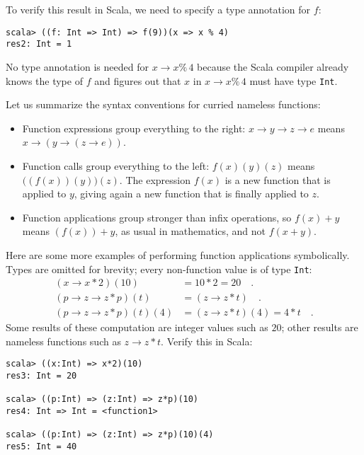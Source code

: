 To verify this result in Scala, we need to specify a type annotation
for $f$:
\begin{lstlisting}
scala> ((f: Int => Int) => f(9))(x => x % 4)
res2: Int = 1
\end{lstlisting}
No type annotation is needed for $x\rightarrow x\%\,4$ because the
Scala compiler already knows the type of $f$ and figures out that
$x$ in $x\rightarrow x\%\,4$ must have type \lstinline!Int!.

Let us summarize the syntax conventions for curried nameless functions:
\begin{itemize}
\item Function expressions group everything to the right: $x\rightarrow y\rightarrow z\rightarrow e$
means $x\rightarrow\left(y\rightarrow\left(z\rightarrow e\right)\right)$.
\item Function calls group everything to the left: $f(x)(y)(z)$ means $\big((f(x))(y)\big)(z)$.
The expression $f(x)$ is a new function that is applied to $y$,
giving again a new function that is finally applied to $z$.
\item Function applications group stronger than infix operations, so $f(x)+y$
means $(f(x))+y$, as usual in mathematics, and not $f(x+y)$.
\end{itemize}
Here are some more examples of performing function applications symbolically.
Types are omitted for brevity; every non-function value is of type
\texttt{}\lstinline!Int!:
\begin{align*}
\left(x\rightarrow x*2\right)(10) & =10*2=20\quad.\\
\left(p\rightarrow z\rightarrow z*p\right)\left(t\right) & =(z\rightarrow z*t)\quad.\\
\left(p\rightarrow z\rightarrow z*p\right)(t)(4) & =(z\rightarrow z*t)(4)=4*t\quad.
\end{align*}
Some results of these computation are integer values such as $20$;
other results are nameless functions such as $z\rightarrow z*t$.
Verify this in Scala:
\begin{lstlisting}
scala> ((x:Int) => x*2)(10)
res3: Int = 20

scala> ((p:Int) => (z:Int) => z*p)(10)
res4: Int => Int = <function1>

scala> ((p:Int) => (z:Int) => z*p)(10)(4)
res5: Int = 40 
\end{lstlisting}

